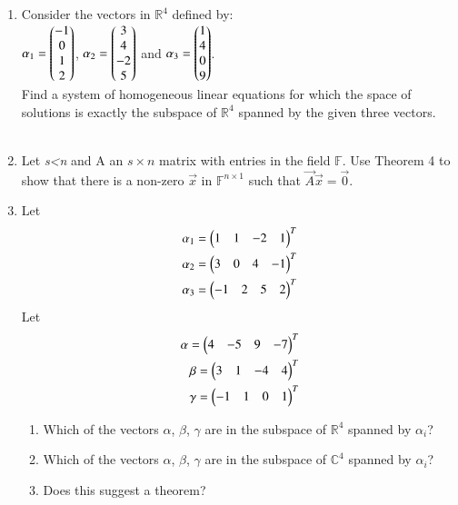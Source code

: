 \renewcommand{\theequation}{\theenumi}
\renewcommand{\thefigure}{\theenumi}
\begin{enumerate}[label=\thesubsection.\arabic*.,ref=\thesubsection.\theenumi]
%
\item Consider the vectors in $\mathbb{R}^4$ defined by:\\
$\alpha_1=\begin{pmatrix}-1\\0\\1\\2\end{pmatrix}$, $\alpha_2=\begin{pmatrix}3\\4\\-2\\5\end{pmatrix}$ and $\alpha_3=\begin{pmatrix}1\\4\\0\\9\end{pmatrix}$.\\
Find a system of homogeneous linear equations for which the space of solutions is exactly the subspace of $\mathbb{R}^4$ spanned by the given three vectors.\\
%
\\
\solution

%
\item Let \textit{s\textless n} and A an $s\times n$ matrix with entries in the field $\mathbb{F}$. Use Theorem 4 to show that there is a non-zero $\vec{x}$ in $\mathbb{F}^{n\times 1}$ such that $\vec{A}\vec{x}=\vec{0}$. 
%
\\
\solution

%
\item Let
\begin{align} 
\alpha_1=\begin{pmatrix}1&1&-2&1\end{pmatrix}^T \\
\alpha_2=\begin{pmatrix}3&0&4&-1\end{pmatrix}^T \\
\alpha_3=\begin{pmatrix}-1&2&5&2\end{pmatrix}^T
\end{align}
Let
\begin{align}
\alpha=\begin{pmatrix}4&-5&9&-7\end{pmatrix}^T \\
\beta=\begin{pmatrix}3&1&-4&4\end{pmatrix}^T \\
\gamma=\begin{pmatrix}-1&1&0&1\end{pmatrix}^T
\end{align}
\begin{enumerate}
\item Which of the vectors $\alpha$, $\beta$, $\gamma$ are in the subspace of $\mathbb{R}^4$ spanned by $\alpha_i$?
\item Which of the vectors $\alpha$, $\beta$, $\gamma$ are in the subspace of $\mathbb{C}^4$ spanned by $\alpha_i$?
\item Does this suggest a theorem?
\end{enumerate}

\end{enumerate}
